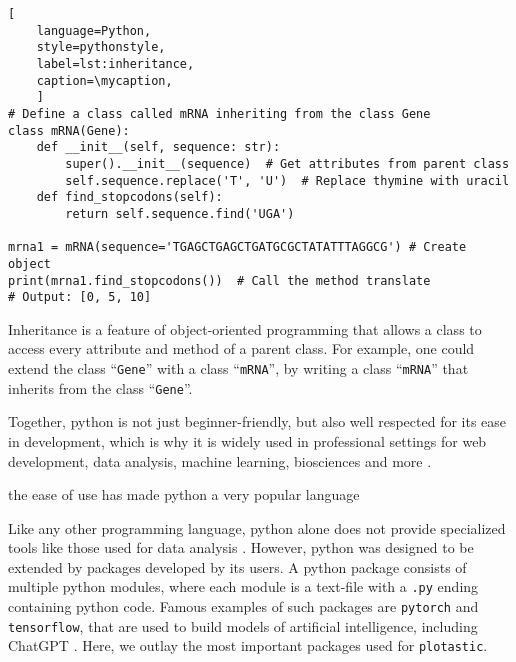 \def\mycaption{ Example of inheritance in python.
    The class ``\texttt{mRNA}'' inherits from the class ``\texttt{Gene}''. The class
    ``\texttt{mRNA}'' has two methods, ``\texttt{\_\_init\_\_}'' and
    ``\texttt{find\_stopcodon}''. The method ``\texttt{find\_stopcodon}'' finds the
    position of stop codons. }
\begin{lstlisting}[
    language=Python,
    style=pythonstyle,
    label=lst:inheritance,
    caption=\mycaption,
    ]
# Define a class called mRNA inheriting from the class Gene
class mRNA(Gene):
    def __init__(self, sequence: str):
        super().__init__(sequence)  # Get attributes from parent class
        self.sequence.replace('T', 'U')  # Replace thymine with uracil
    def find_stopcodons(self):
        return self.sequence.find('UGA')

mrna1 = mRNA(sequence='TGAGCTGAGCTGATGCGCTATATTTAGGCG') # Create object
print(mrna1.find_stopcodons())  # Call the method translate
# Output: [0, 5, 10]
\end{lstlisting}

Inheritance is a feature of object-oriented programming that allows
a class to access every attribute and method of a parent class. For example, one
could extend the class ``\texttt{Gene}'' with a class ``\texttt{mRNA}'', by
writing a class ``\texttt{mRNA}'' that inherits from the class ``\texttt{Gene}''.

Together, python is not just beginner-friendly, but also well respected for its
ease in development, which is why it is widely used in professional settings for
web development, data analysis, machine learning, biosciences and more \cite{ekmekciIntroductionProgrammingBioscientists2016}.

the ease of use has made python a very popular language~\cite{rayhanRisePythonSurvey2023}

Like any other programming language, python alone does not provide specialized
tools like those used for data analysis \cite{PythonLanguageReference}. However,
python was designed to be extended by packages developed by its users. A python
package consists of multiple python modules, where each module is a text-file
with a \texttt{.py} ending containing python code. Famous examples of such
packages are \texttt{pytorch} and \texttt{tensorflow}, that are used to build
models of artificial intelligence, including ChatGPT
\cite{paszkePyTorchImperativeStyle2019, abadiTensorFlowLargeScaleMachine2016,
    radfordLanguageModelsAre2019}. Here, we outlay the most important packages used
for \texttt{plotastic}.



